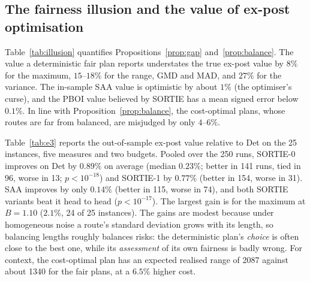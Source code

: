 \documentclass[11pt]{article}
\theoremstyle{definition}
\begin{document}
\subsection{The fairness illusion and the value of ex-post optimisation}\label{sec:exp:main}
Table~\ref{tab:illusion} quantifies Propositions~\ref{prop:gap}
and~\ref{prop:balance}. The value a deterministic fair plan reports understates
the true ex-post value by $8\%$ for the maximum, $15$--$18\%$ for the range, GMD
and MAD, and $27\%$ for the variance. The in-sample SAA value is optimistic by
about $1\%$ (the optimiser's curse), and the PBOI value believed by SORTIE has a
mean signed error below $0.1\%$. In line with Proposition~\ref{prop:balance},
the cost-optimal plans, whose routes are far from balanced, are misjudged by
only $4$--$6\%$.

\begin{table}[t]\centering\small
\caption{Believed against true ex-post value (mean signed \%, 50 runs per
cell; truth: simulation without the day factor, which is what each model
represents). Last column: largest absolute PBOI error for any plan.}\label{tab:illusion}

\end{table}

Table~\ref{tab:e3} reports the out-of-sample ex-post value relative to Det on
the 25 instances, five measures and two budgets. Pooled over the 250 runs,
SORTIE-0 improves on Det by $0.89\%$ on average (median $0.23\%$; better in 141
runs, tied in 96, worse in 13; $p<10^{-18}$) and SORTIE-1 by $0.77\%$ (better in
154, worse in 31). SAA improves by only $0.14\%$ (better in 115, worse in 74),
and both SORTIE variants beat it head to head ($p<10^{-17}$). The largest gain
is for the maximum at $B=1.10$ ($2.1\%$, 24 of 25 instances). The gains are
modest because under homogeneous noise a route's standard deviation grows with
its length, so balancing lengths roughly balances risks: the deterministic
plan's \emph{choice} is often close to the best one, while its
\emph{assessment} of its own fairness is badly wrong. For context, the
cost-optimal plan has an expected realised range of 2087 against about 1340 for
the fair plans, at a $6.5\%$ higher cost.

\begin{table}[t]\centering\small
\caption{Improvement of the out-of-sample ex-post value over Det (mean \%,
positive is better; in brackets the number of instances, of 25, on which the
method is strictly better). $^\ast$: Wilcoxon signed-rank $p<0.05$ in favour
of the method.}\label{tab:e3}

\end{table}
\end{document}
